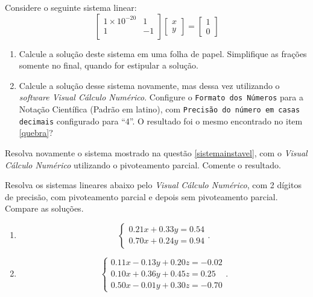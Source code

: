 \begin{ex}
Considere o seguinte sistema linear:\label{sistemainstavel}
$$\begin{bmatrix}
1\times 10^{-20}	&1\\
1					&-1\\
\end{bmatrix}
\begin{bmatrix}
x\\y
\end{bmatrix}=
\begin{bmatrix}
1\\0
\end{bmatrix}$$
\begin{enumerate}
\item Calcule a solução deste sistema em uma folha de papel. Simplifique as frações somente no final, quando for estipular a solução. \label{quebra}
\item Calcule a solução desse sistema novamente, mas dessa vez utilizando o \emph{software Visual Cálculo Numérico}. Configure o {\tt Formato dos Números} para a Notação Científica (Padrão em latino), com {\tt Precisão do número em casas decimais} configurado para ``4''. O resultado foi o mesmo encontrado no item \ref{quebra}? 
\end{enumerate}
\end{ex}

\begin{ex}
Resolva novamente o sistema mostrado na questão \ref{sistemainstavel}, com o \emph{Visual Cálculo Numérico} utilizando o pivoteamento parcial. Comente o resultado.
\end{ex}


\begin{ex}
Resolva os sistemas lineares abaixo pelo \emph{Visual Cálculo Numérico}, com 2 dígitos de precisão, com pivoteamento parcial e depois sem pivoteamento parcial. Compare as soluções.
\begin{enumerate}

\item $$\begin{cases}
0.21x+0.33y=0.54\\
0.70x+0.24y=0.94
\end{cases}.$$
\item $$\begin{cases}
0.11x-0.13y+0.20z=-0.02\\
0.10x+0.36y+0.45z=0.25\\
0.50x-0.01y+0.30z=-0.70
\end{cases}.$$
\end{enumerate}

\end{ex}




